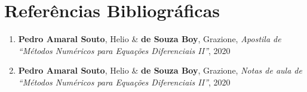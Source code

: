 \chapter{Referências Bibliográficas}

\begin{enumerate}
    \item \textbf{Pedro Amaral Souto}, Helio \& \textbf{de Souza Boy},
    Grazione, \textsl{Apostila de ``Métodos Numéricos para Equações
    Diferenciais II''}, 2020
    \item \textbf{Pedro Amaral Souto}, Helio \& \textbf{de Souza Boy},
    Grazione, \textsl{Notas de aula de ``Métodos Numéricos para Equações
    Diferenciais II''}, 2020
\end{enumerate}